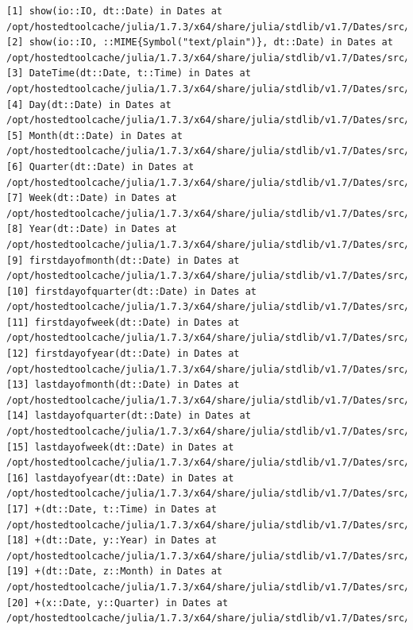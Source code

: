 \documentclass[
  notoc %
]{tufte-book}
\begin{document}
\begin{lstlisting}[language=Output]
[1] show(io::IO, dt::Date) in Dates at /opt/hostedtoolcache/julia/1.7.3/x64/share/julia/stdlib/v1.7/Dates/src/io.jl:736
[2] show(io::IO, ::MIME{Symbol("text/plain")}, dt::Date) in Dates at /opt/hostedtoolcache/julia/1.7.3/x64/share/julia/stdlib/v1.7/Dates/src/io.jl:734
[3] DateTime(dt::Date, t::Time) in Dates at /opt/hostedtoolcache/julia/1.7.3/x64/share/julia/stdlib/v1.7/Dates/src/types.jl:403
[4] Day(dt::Date) in Dates at /opt/hostedtoolcache/julia/1.7.3/x64/share/julia/stdlib/v1.7/Dates/src/periods.jl:36
[5] Month(dt::Date) in Dates at /opt/hostedtoolcache/julia/1.7.3/x64/share/julia/stdlib/v1.7/Dates/src/periods.jl:36
[6] Quarter(dt::Date) in Dates at /opt/hostedtoolcache/julia/1.7.3/x64/share/julia/stdlib/v1.7/Dates/src/periods.jl:36
[7] Week(dt::Date) in Dates at /opt/hostedtoolcache/julia/1.7.3/x64/share/julia/stdlib/v1.7/Dates/src/periods.jl:36
[8] Year(dt::Date) in Dates at /opt/hostedtoolcache/julia/1.7.3/x64/share/julia/stdlib/v1.7/Dates/src/periods.jl:36
[9] firstdayofmonth(dt::Date) in Dates at /opt/hostedtoolcache/julia/1.7.3/x64/share/julia/stdlib/v1.7/Dates/src/adjusters.jl:84
[10] firstdayofquarter(dt::Date) in Dates at /opt/hostedtoolcache/julia/1.7.3/x64/share/julia/stdlib/v1.7/Dates/src/adjusters.jl:157
[11] firstdayofweek(dt::Date) in Dates at /opt/hostedtoolcache/julia/1.7.3/x64/share/julia/stdlib/v1.7/Dates/src/adjusters.jl:52
[12] firstdayofyear(dt::Date) in Dates at /opt/hostedtoolcache/julia/1.7.3/x64/share/julia/stdlib/v1.7/Dates/src/adjusters.jl:119
[13] lastdayofmonth(dt::Date) in Dates at /opt/hostedtoolcache/julia/1.7.3/x64/share/julia/stdlib/v1.7/Dates/src/adjusters.jl:100
[14] lastdayofquarter(dt::Date) in Dates at /opt/hostedtoolcache/julia/1.7.3/x64/share/julia/stdlib/v1.7/Dates/src/adjusters.jl:180
[15] lastdayofweek(dt::Date) in Dates at /opt/hostedtoolcache/julia/1.7.3/x64/share/julia/stdlib/v1.7/Dates/src/adjusters.jl:68
[16] lastdayofyear(dt::Date) in Dates at /opt/hostedtoolcache/julia/1.7.3/x64/share/julia/stdlib/v1.7/Dates/src/adjusters.jl:135
[17] +(dt::Date, t::Time) in Dates at /opt/hostedtoolcache/julia/1.7.3/x64/share/julia/stdlib/v1.7/Dates/src/arithmetic.jl:19
[18] +(dt::Date, y::Year) in Dates at /opt/hostedtoolcache/julia/1.7.3/x64/share/julia/stdlib/v1.7/Dates/src/arithmetic.jl:27
[19] +(dt::Date, z::Month) in Dates at /opt/hostedtoolcache/julia/1.7.3/x64/share/julia/stdlib/v1.7/Dates/src/arithmetic.jl:54
[20] +(x::Date, y::Quarter) in Dates at /opt/hostedtoolcache/julia/1.7.3/x64/share/julia/stdlib/v1.7/Dates/src/arithmetic.jl:73
\end{lstlisting}
\end{document}
